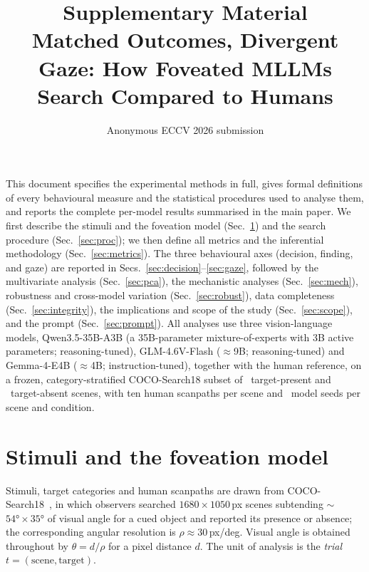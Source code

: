 \documentclass[runningheads]{llncs}
\begin{document}
\title{Supplementary Material\\ Matched Outcomes, Divergent Gaze: How Foveated MLLMs Search Compared to Humans}
\author{Anonymous ECCV 2026 submission}
\maketitle

\renewcommand{\thesection}{S\arabic{section}}
\renewcommand{\thetable}{S\arabic{table}}
\renewcommand{\thefigure}{S\arabic{figure}}
\setcounter{section}{0}\setcounter{table}{0}\setcounter{figure}{0}

This document specifies the experimental methods in full, gives formal definitions of every behavioural
measure and the statistical procedures used to analyse them, and reports the complete per-model results
summarised in the main paper. We first describe the stimuli and the foveation model
(Sec.~\ref{sec:fov}) and the search procedure (Sec.~\ref{sec:proc}); we then define all metrics and the
inferential methodology (Sec.~\ref{sec:metrics}). The three behavioural axes (decision, finding, and
gaze) are reported in Secs.~\ref{sec:decision}--\ref{sec:gaze}, followed by the multivariate analysis
(Sec.~\ref{sec:pca}), the mechanistic analyses (Sec.~\ref{sec:mech}), robustness and cross-model
variation (Sec.~\ref{sec:robust}), data completeness (Sec.~\ref{sec:integrity}), the implications
and scope of the study (Sec.~\ref{sec:scope}), and the prompt (Sec.~\ref{sec:prompt}). All analyses use three vision-language models,
Qwen3.5-35B-A3B (a 35B-parameter mixture-of-experts with 3B active parameters; reasoning-tuned),
GLM-4.6V-Flash ($\approx$9B; reasoning-tuned) and Gemma-4-E4B ($\approx$4B; instruction-tuned), together with the
human reference, on a frozen, category-stratified COCO-Search18 subset of \NImagesTP\ target-present and
\NImagesTA\ target-absent scenes, with ten human scanpaths per scene and \NSeeds\ model seeds per scene
and condition.
 
 
\section{Stimuli and the foveation model}\label{sec:fov}
Stimuli, target categories and human scanpaths are drawn from COCO-Search18~\cite{chen2021cocosearch18},
in which observers searched $1680{\times}1050$\,px scenes subtending $\sim$$54°{\times}35°$ of visual
angle for a cued object and reported its presence or absence; the corresponding angular resolution is
$\rho \approx 30$\,px/deg. Visual angle is obtained throughout by $\theta = d/\rho$ for a pixel distance
$d$. The unit of analysis is the \emph{trial} $t=(\text{scene},\text{target})$.
 
\end{document}
